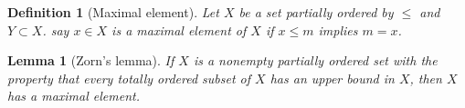 \documentclass{article}
\newcommand{\nextline}{\hfill\break}
\newtheorem{definition}[example]{Definition}
\newtheorem{lemma}[example]{Lemma}
\begin{document}
\begin{definition}[Maximal element]\rm\nextline
    Let \(X\) be a set partially ordered by \(\leq\) and \(Y\subset X\). say \(x\in X\) is a maximal element of \(X\) if \(x\leq m\) implies \(m=x\).

\end{definition}
\begin{lemma}[Zorn's lemma]\label{Zorn's Lemma}\rm\nextline
    If \(X\) is a nonempty partially ordered set with the
    property that every totally ordered subset of \(X\) has an upper bound in \(X\), then \(X\) has
    a maximal element.
\end{lemma}
\end{document}
